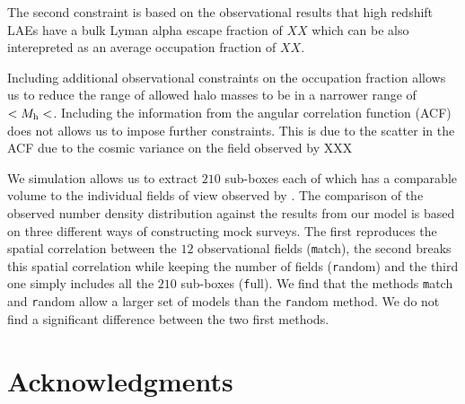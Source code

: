 \documentclass[usenatbib]{mn2e}
\begin{document}
The second constraint is based on the observational results that high
redshift LAEs have a bulk Lyman alpha escape fraction of $XX$ which
can be also interepreted as an average occupation fraction of $XX$.

Including additional observational constraints on the occupation
fraction allows us to reduce the range of allowed halo masses to be in
a narrower range of $<M_{\rm h}<$. Including the information from the
angular correlation function (ACF) does not allows us to impose
further constraints. This is due to the scatter in the ACF due to the
cosmic variance on the field observed by XXX


We simulation allows us to extract $210$ sub-boxes each of which has a
comparable volume to the individual fields of view observed by
\cite{Yamada2012}. The comparison of the observed number density
distribution against the results from our model is based on three
different ways of constructing mock surveys. The first reproduces the
spatial correlation between the $12$ observational fields ({\texttt
  match}), the second breaks this spatial correlation while keeping
the number of fields ({\texttt random}) and the third one simply
includes all the $210$ sub-boxes ({\texttt full}). We find that the
methods {\texttt match} and {\texttt random} allow a larger set of
models than the {{\texttt random}} method. We do not find a
significant difference between the two first methods. 


\section*{Acknowledgments} 
\end{document}
